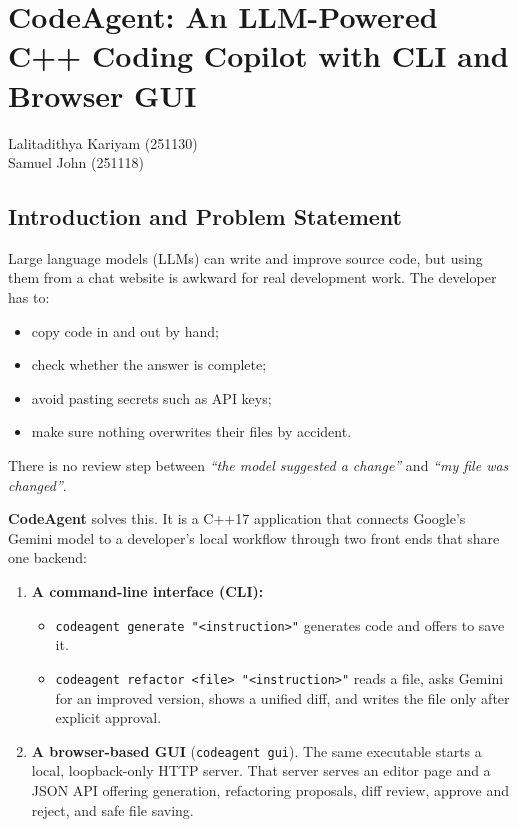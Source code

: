 \documentclass[12pt,a4paper,oneside]{book}
\makeatletter
\newcommand{\chapterauthor}[1]{%
  {\parindent0pt\vspace*{-15pt}%
  \linespread{1.1}\large\itshape\begin{flushright}#1\end{flushright}%
  \par\nobreak\vspace*{25pt}}
  \@afterheading%
}
\makeatother
\begin{document}
\setcounter{chapter}{13}
\chapter[CodeAgent: An LLM-Powered C++ Coding Copilot]{CodeAgent: An LLM-Powered C++ Coding Copilot with CLI and Browser GUI}
\chapterauthor{Lalitadithya Kariyam (251130) \\ Samuel John (251118)}

\section{Introduction and Problem Statement}

Large language models (LLMs) can write and improve source code, but using them
from a chat website is awkward for real development work. The developer has to:
\begin{itemize}
  \item copy code in and out by hand;
  \item check whether the answer is complete;
  \item avoid pasting secrets such as API keys;
  \item make sure nothing overwrites their files by accident.
\end{itemize}
There is no review step between \emph{``the model suggested a change''} and
\emph{``my file was changed''}.

\textbf{CodeAgent} solves this. It is a C++17 application that connects
Google's Gemini model to a developer's local workflow through two front ends
that share one backend:

\begin{enumerate}
  \item \textbf{A command-line interface (CLI):}
    \begin{itemize}
      \item \texttt{codeagent generate "<instruction>"} generates code and
        offers to save it.
      \item \texttt{codeagent refactor <file> "<instruction>"} reads a file,
        asks Gemini for an improved version, shows a unified diff, and writes
        the file only after explicit approval.
    \end{itemize}
  \item \textbf{A browser-based GUI} (\texttt{codeagent gui}). The same
    executable starts a local, loopback-only HTTP server. That server serves
    an editor page and a JSON API offering generation, refactoring proposals,
    diff review, approve and reject, and safe file saving.
\end{enumerate}
\end{document}

